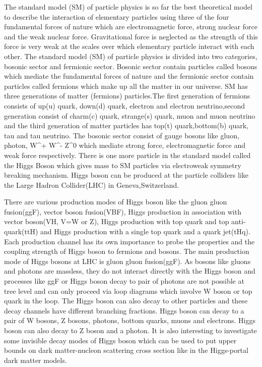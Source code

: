 \documentclass[final,3p]{CSP}
\begin{document}
The standard model (SM) of particle physics is so far the best theoretical model to describe the interaction of elementary 
particles using three of the four fundamental forces of nature which are electromagnetic force, strong nuclear force and the weak
nuclear force. Gravitational force is neglected as the strength of this force is very weak at the scales over which elementary 
particle interact with each other. The standard model (SM) of particle physics is divided into two categories, bosonic sector 
and fermionic sector. Bosonic sector contain particles called bosons which mediate the fundamental forces of nature and the
fermionic sector contain particles called fermions which make up all the matter in our universe. SM has three generations of 
matter (fermions) particles.The first generation of fermions consists of up(u) quark, down(d) quark, electron and electron neutrino,second generation consist of charm(c) quark, strange(s) quark, muon and muon neutrino and the third generation of matter 
particles has top(t) quark,bottom(b) quark, tau and tau neutrino. The bosonic sector consist of gauge bosons like gluon, photon, 
W^+ W^- Z^0 which mediate strong force, electromagnetic force and weak force respectively. There is one more particle in the 
standard model called the Higgs Boson which gives mass to SM particles via electroweak symmetry breaking mechanism. Higgs boson 
can be produced at the particle colliders like the Large Hadron Collider(LHC) in Geneva,Switzerland. 

There are various production modes of Higgs boson like the gluon gluon fusion(ggF), vector boson fusion(VBF), Higgs production 
in association with vector boson(VH, V=W or Z), Higgs production with top quark and top anti-quark(ttH) and Higgs production with 
a single top quark and a quark jet(tHq). Each production channel has its own importance to probe the properties and the coupling 
strength of Higgs boson to fermions and bosons. The main production mode of Higgs bosons at LHC is gluon gluon fusion(ggF). As 
bosons like gluons and photons are massless, they do not interact directly with the Higgs boson and processes like ggF or Higgs 
boson decay to pair of photons are not possible at tree level and can only proceed via loop diagrams which involve W boson or top 
quark in the loop. The Higgs boson can also decay to other particles and these decay channels have different branching fractions. 
Higgs boson can decay to a pair of W bosons, Z bosons, photons, bottom quarks, muons and electrons. Higgs boson can also decay to 
Z boson and a photon. It is also interesting to investigate some invisible decay modes of Higgs boson which can be used to put 
upper bounds on dark matter-nucleon scattering cross section like in the Higgs-portal dark matter models. 
\end{document}

